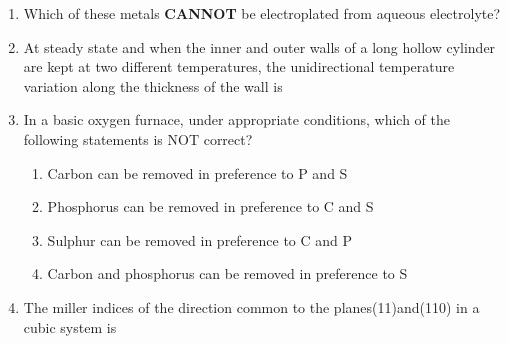 \documentclass[journal,12pt,onecolumn]{IEEEtran}
\theoremstyle{remark}
\begin{document}
\begin{enumerate}
    \item Which of these metals \textbf{CANNOT} be electroplated from aqueous electrolyte?  
    \hfill{}
    \begin{enumerate}[label=(\Alph*)]
    \end{enumerate}

    \item At steady state and when the inner and outer walls of a long hollow cylinder are kept at two different temperatures, the unidirectional temperature variation along the thickness of the wall is  
    \hfill{}
    \begin{enumerate}[label=(\Alph*)]
    \end{enumerate}
    

    \item In a basic oxygen furnace, under appropriate conditions, which of the following statements is NOT correct?
    \hfill{}
    \begin{enumerate}[label=(\Alph*)]
        \item Carbon can be removed in preference to P and S
        \item Phosphorus can be removed in preference to C and S
        \item Sulphur can be removed in preference to C and P
        \item Carbon and phosphorus can be removed in preference to S
    \end{enumerate}
    \item The miller indices of the direction common to the planes(11)and(110) in a cubic system is 
    \hfill{}
    \begin{enumerate}[label=(\Alph*)]
    \end{enumerate} 


\end{enumerate}
\end{document}

